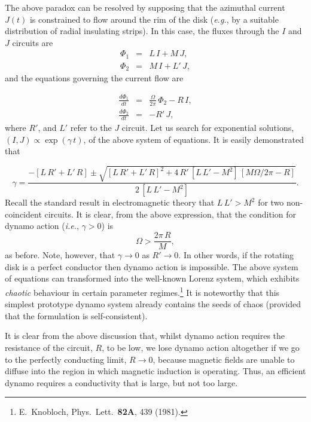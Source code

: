 The above paradox can be resolved by supposing that the azimuthal current
$J(t)$ is constrained to flow around the rim of the disk ({\em e.g.},
by a suitable distribution of radial insulating strips). In this
case, the fluxes through the $I$ and $J$ circuits are
\begin{eqnarray}
{\Phi}_1 &=& L\,I + M\, J,\\[0.5ex]
{\Phi}_2 &=& M\,I + L'\,J,
\end{eqnarray}
and the equations governing the current flow are

\begin{eqnarray}
\frac{d{\Phi}_1}{dt} &=& \frac{{\Omega}}{2\pi}\,{\Phi}_2 - R\,I,\\[0.5ex]
\frac{d{\Phi}_2}{dt} &=& - R'\,J,
\end{eqnarray}
where $R'$, and $L'$ refer to the $J$ circuit. Let us search
for exponential solutions, $(I,J)\propto \exp(\gamma\,t)$, of the
above system of equations. It is easily
demonstrated that

\begin{equation}
\gamma = \frac{ -[L\,R'+L'\,R] \pm \sqrt{[L\,R'+L'\,R]^2 + 4\,R'\,[L\,L'-M^2]\,
[M{\Omega}/2\pi -R]}}{2\,[L\,L'-M^2]}.
\end{equation}
Recall the standard result in electromagnetic theory that $L\,L'>M^2$ for two
non-coincident circuits. It is clear, from the above expression, that the
condition for dynamo action ({\em i.e.}, $\gamma>0$) is
\begin{equation}
{\Omega} > \frac{ 2\pi\,R}{M},
\end{equation}
as before. Note, however, that $\gamma\rightarrow 0$ as $R'\rightarrow 0$.
In other words, if the rotating disk is a perfect conductor then dynamo
action is impossible. The above system of equations can transformed
into the well-known Lorenz system, which exhibits {\em chaotic}\/ behaviour
in certain parameter regimes.\footnote{E.~Knobloch, Phys.\ Lett.\ {\bf 82A},
439 (1981).} It is noteworthy that this simplest prototype
dynamo system already contains the seeds of chaos (provided that
the formulation is self-consistent). 

It is clear from the above discussion that, whilst dynamo action requires the
resistance of the circuit, $R$, to be low, we lose dynamo action 
altogether if we go to the
perfectly conducting limit, $R\rightarrow 0$, because magnetic fields are unable to diffuse
into the region in which magnetic induction is operating. Thus, an efficient
dynamo requires a conductivity that is large, but not too large. 

